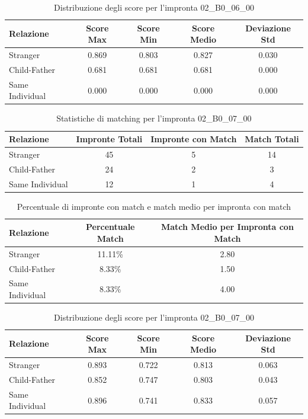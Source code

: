 \begin{table}[htbp]
\centering
\caption{Distribuzione degli score per l'impronta 02\_B0\_06\_00}
\label{tab:scores_02_B0_06_00}
\begin{tabular}{|l|c|c|c|c|}
\hline
\textbf{Relazione} & \textbf{Score Max} & \textbf{Score Min} & \textbf{Score Medio} & \textbf{Deviazione Std} \\
\hline
Stranger & 0.869 & 0.803 & 0.827 & 0.030 \\
\hline
Child-Father & 0.681 & 0.681 & 0.681 & 0.000 \\
\hline
Same Individual & 0.000 & 0.000 & 0.000 & 0.000 \\
\hline
\end{tabular}
\end{table}


\begin{table}[htbp]
\centering
\caption{Statistiche di matching per l'impronta 02\_B0\_07\_00}
\label{tab:results_02_B0_07_00}
\begin{tabular}{|l|c|c|c|}
\hline
\textbf{Relazione} & \textbf{Impronte Totali} & \textbf{Impronte con Match} & \textbf{Match Totali} \\
\hline
Stranger & 45 & 5 & 14 \\
\hline
Child-Father & 24 & 2 & 3 \\
\hline
Same Individual & 12 & 1 & 4 \\
\hline
\end{tabular}
\end{table}


\begin{table}[htbp]
\centering
\caption{Percentuale di impronte con match e match medio per impronta con match}
\label{tab:match_percentage_02_B0_07_00}
\begin{tabular}{|l|c|c|}
\hline
\textbf{Relazione} & \textbf{Percentuale Match} & \textbf{Match Medio per Impronta con Match} \\
\hline
Stranger & 11.11\% & 2.80 \\
\hline
Child-Father & 8.33\% & 1.50 \\
\hline
Same Individual & 8.33\% & 4.00 \\
\hline
\end{tabular}
\end{table}


\begin{table}[htbp]
\centering
\caption{Distribuzione degli score per l'impronta 02\_B0\_07\_00}
\label{tab:scores_02_B0_07_00}
\begin{tabular}{|l|c|c|c|c|}
\hline
\textbf{Relazione} & \textbf{Score Max} & \textbf{Score Min} & \textbf{Score Medio} & \textbf{Deviazione Std} \\
\hline
Stranger & 0.893 & 0.722 & 0.813 & 0.063 \\
\hline
Child-Father & 0.852 & 0.747 & 0.803 & 0.043 \\
\hline
Same Individual & 0.896 & 0.741 & 0.833 & 0.057 \\
\hline
\end{tabular}
\end{table}


